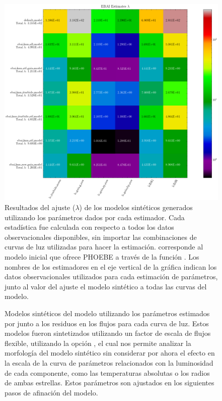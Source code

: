 \begin{figure}[!ht]
	\centering
	\includegraphics[scale=0.6]{Metodologia/Secciones/ModeloComputacional/Figures/EstimadoresChiResultados.png}

	\caption{Resultados del ajuste ($\lambda$) de los modelos sintéticos
		generados utilizando los parámetros dados por cada estimador. Cada
		estadística fue calculada con respecto a todos los datos observacionales
		disponibles, sin importar las combinaciones de curvas de luz utilizadas
		para hacer la estimación.  corresponde al modelo
		inicial que ofrece PHOEBE a través de la función
		. Los nombres de los estimadores
		en el eje vertical de la gráfica indican los datos observacionales
		utilizados para cada estimación de parámetros, junto al valor del ajuste
		el modelo sintético a todas las curvas del modelo. }
	\label{figuraEstimadoresLambda}
\end{figure}

\begin{figure}[!ht]
	\centering

	\caption{Modelos sintéticos del modelo utilizando los parámetros estimados
	por  junto a los residuos en los flujos
	para cada curva de luz. Estos modelos fueron sintetizados utilizando un
	factor de escala de flujos flexible, utilizando la opción , el cual nos permite analizar la morfología del modelo
	sintético sin considerar por ahora el efecto en la escala de la curva de
	parámetros relacionados con la luminosidad de cada componente, como las
	temperaturas absolutas o los radios de ambas estrellas. Estos parámetros son
	ajustados en los siguientes pasos de afinación del modelo.}
	\label{figuraEstimacionInicialModelo}
\end{figure}

